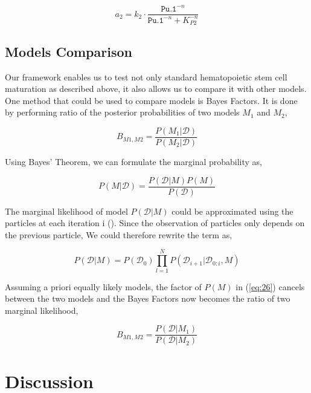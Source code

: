 \documentclass{bioinfo}
\begin{document}
\begin{equation}
a_2 = k_2 \cdot \frac{\texttt{Pu.1}^{-n}}{\texttt{Pu.1}^{-n} + K_{P2}^{-n}}\label{eq:25}
\end{equation}

\subsection{Models Comparison}

Our framework enables us to test not only standard hematopoietic stem cell maturation as described above, it also allows us to compare it with other models. One method that could be used to compare models is Bayes Factors. It is done by performing ratio of the posterior probabilities of two models $M_1$ and $M_2$,

\begin{equation}
B_{M1, M2} = \frac{P(M_1 | \mathcal{D})}{P(M_2 | \mathcal{D})}\label{eq:26}
\end{equation}

Using Bayes' Theorem, we can formulate the marginal probability as,

\begin{equation}
P(M | \mathcal{D}) = \frac{P(\mathcal{D} | M) P(M)}{P(\mathcal{D})}\label{eq:27}
\end{equation}

The marginal likelihood of model $P(\mathcal{D} | M)$ could be approximated using the particles at each iteration i (\citealp{Wilkinson11}). Since the observation of particles only depends on the previous particle, We could therefore rewrite the term as,

\begin{equation}
P(\mathcal{D} | M) = P(\mathcal{D_0}) \prod_{l=1}^{N} P(\mathcal{D}_{i+1} | \mathcal{D}_{0:i}, M)\label{eq:28}
\end{equation}

Assuming a priori equally likely models, the factor of $P(M)$ in (\ref{eq:26}) cancels between the two models and the Bayes Factors now becomes the ratio of two marginal likelihood,

\begin{equation}
B_{M1, M2} = \frac{P(\mathcal{D} | M_1)}{P(\mathcal{D} | M_2)}\label{eq:29}
\end{equation}


\section{Discussion}
\end{document}
